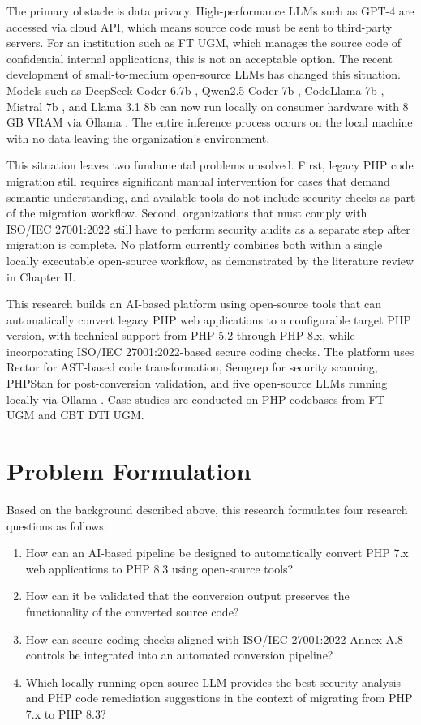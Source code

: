 The primary obstacle is data privacy. High-performance LLMs such as GPT-4 are accessed via cloud API, which means source code must be sent to third-party servers. For an institution such as FT UGM, which manages the source code of confidential internal applications, this is not an acceptable option. The recent development of small-to-medium open-source LLMs has changed this situation. Models such as DeepSeek Coder 6.7b \cite{deepseek2024coder}, Qwen2.5-Coder 7b \cite{hui2024qwen}, CodeLlama 7b \cite{roziere2024codellama}, Mistral 7b \cite{jiang2023mistral}, and Llama 3.1 8b \cite{dubey2024llama3} can now run locally on consumer hardware with 8 GB VRAM via Ollama \cite{ollama2024}. The entire inference process occurs on the local machine with no data leaving the organization's environment.

This situation leaves two fundamental problems unsolved. First, legacy PHP code migration still requires significant manual intervention for cases that demand semantic understanding, and available tools do not include security checks as part of the migration workflow. Second, organizations that must comply with ISO/IEC 27001:2022 still have to perform security audits as a separate step after migration is complete. No platform currently combines both within a single locally executable open-source workflow, as demonstrated by the literature review in Chapter II.

This research builds an AI-based platform using open-source tools that can automatically convert legacy PHP web applications to a configurable target PHP version, with technical support from PHP 5.2 through PHP 8.x, while incorporating ISO/IEC 27001:2022-based secure coding checks. The platform uses Rector \cite{rector2024} for AST-based code transformation, Semgrep \cite{semgrep2024} for security scanning, PHPStan \cite{phpstan2024} for post-conversion validation, and five open-source LLMs running locally via Ollama \cite{ollama2024}. Case studies are conducted on PHP codebases from FT UGM and CBT DTI UGM.

\section{Problem Formulation}

Based on the background described above, this research formulates four research questions as follows:

\begin{enumerate}
    \item How can an AI-based pipeline be designed to automatically convert PHP 7.x web applications to PHP 8.3 using open-source tools?
    \item How can it be validated that the conversion output preserves the functionality of the converted source code?
    \item How can secure coding checks aligned with ISO/IEC 27001:2022 Annex A.8 controls be integrated into an automated conversion pipeline?
    \item Which locally running open-source LLM provides the best security analysis and PHP code remediation suggestions in the context of migrating from PHP 7.x to PHP 8.3?
\end{enumerate}


